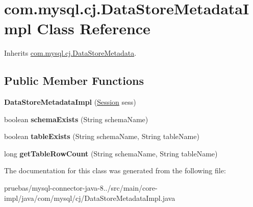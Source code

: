 \hypertarget{classcom_1_1mysql_1_1cj_1_1_data_store_metadata_impl}{}\section{com.\+mysql.\+cj.\+Data\+Store\+Metadata\+Impl Class Reference}
\label{classcom_1_1mysql_1_1cj_1_1_data_store_metadata_impl}


Inherits \mbox{\hyperlink{interfacecom_1_1mysql_1_1cj_1_1_data_store_metadata}{com.\+mysql.\+cj.\+Data\+Store\+Metadata}}.

\subsection*{Public Member Functions}
\begin{DoxyCompactItemize}
\item 
\mbox{\label{classcom_1_1mysql_1_1cj_1_1_data_store_metadata_impl_aeff907c531b01c9e68318d8d800929e8}} 
{\bfseries Data\+Store\+Metadata\+Impl} (\mbox{\hyperlink{interfacecom_1_1mysql_1_1cj_1_1_session}{Session}} sess)
\item 
\mbox{\label{classcom_1_1mysql_1_1cj_1_1_data_store_metadata_impl_a56f0ee01f926da85fa6c7e692abd8ba1}} 
boolean {\bfseries schema\+Exists} (String schema\+Name)
\item 
\mbox{\label{classcom_1_1mysql_1_1cj_1_1_data_store_metadata_impl_a4e68791d006063644a74604988f41c23}} 
boolean {\bfseries table\+Exists} (String schema\+Name, String table\+Name)
\item 
\mbox{\label{classcom_1_1mysql_1_1cj_1_1_data_store_metadata_impl_a8fc9c60e1f7bb1d72c63bdad408a511a}} 
long {\bfseries get\+Table\+Row\+Count} (String schema\+Name, String table\+Name)
\end{DoxyCompactItemize}


The documentation for this class was generated from the following file\+:\begin{DoxyCompactItemize}
\item 
pruebas/mysql-\/connector-\/java-\/8../src/main/core-\/impl/java/com/mysql/cj/Data\+Store\+Metadata\+Impl.\+java\end{DoxyCompactItemize}
